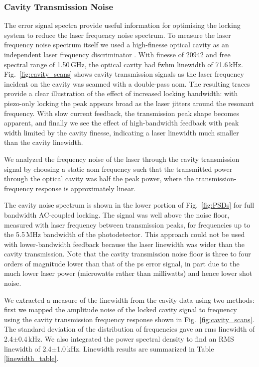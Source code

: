 
\subsubsection{Cavity Transmission Noise}
The error signal spectra provide useful information for optimising the locking system to reduce the laser frequency noise spectrum.  To measure the laser frequency noise spectrum itself we used a high-finesse optical cavity as an independent laser frequency discriminator \cite{equipment}. With finesse of 20942 and free spectral range of 1.50\,GHz, the optical cavity had \gls*{fwhm} linewidth of 71.6\,kHz. 
Fig.~\ref{fig:cavity_scans} shows cavity transmission signals as the laser frequency incident on the cavity was scanned with a double-pass \gls*{aom}. The resulting traces provide a clear illustration of the effect of increased locking bandwidth: with piezo-only locking the peak appears broad as the laser jitters around the resonant frequency. With slow current feedback, the transmission peak shape becomes apparent, and finally we see the effect of high-bandwidth feedback with peak width limited by the cavity finesse, indicating a laser linewidth much smaller than the cavity linewidth.

We analyzed the frequency noise of the laser through the cavity transmission signal by choosing a static \gls*{aom} frequency such that the transmitted power through the optical cavity was half the peak power, where the transmission-frequency response is approximately linear. 

The cavity noise spectrum is shown in the lower portion of Fig.~\ref{fig:PSDs} for full bandwidth AC-coupled locking. The signal was well above the noise floor, measured with laser frequency between transmission peaks, for frequencies up to the 5.5\,MHz bandwidth of the photodetector.  This approach could not be used with lower-bandwidth feedback because the laser linewidth was wider than the cavity transmission.  Note that the cavity transmission noise floor is three to four orders of magnitude lower than that of the \gls*{ps} error signal, in part due to the much lower laser power (microwatts rather than milliwatts) and hence lower shot noise.

We extracted a measure of the linewidth from the cavity data using two methods: first we mapped the amplitude noise of the locked cavity signal to frequency using the cavity transmission frequency response shown in Fig.~\ref{fig:cavity_scans}. The standard deviation of the distribution of frequencies gave an \gls*{rms} linewidth of 2.4$\pm$0.4\,kHz.  We also integrated the power spectral density to find an RMS linewidth \cite{negnevitsky_wideband_2013} of 2.4$\pm$1.0\,kHz. Linewidth results are summarized in Table \ref{linewidth_table}.

